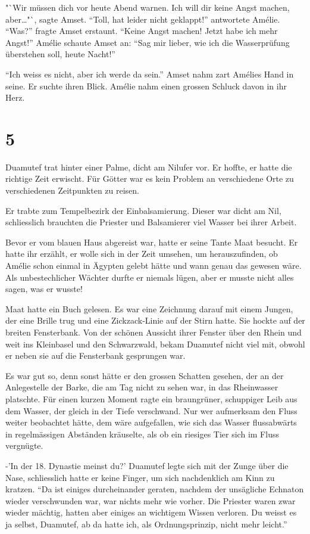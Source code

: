 \documentclass[11pt,titlepage,a5paper]{book}
\begin{document}
"`Wir müssen dich vor heute Abend warnen. Ich will dir keine Angst machen, aber\dots"`, sagte Amset. "`Toll, hat leider nicht geklappt!"' antwortete Amélie. "`Was?"' fragte Amset erstaunt. "`Keine Angst machen! Jetzt habe ich mehr Angst!"' Amélie schaute Amset an: "`Sag mir lieber, wie ich die Wasserprüfung überstehen soll, heute Nacht!"' 

"`Ich weiss es nicht, aber ich werde da sein."' Amset nahm zart Amélies Hand in seine. Er suchte ihren Blick. Amélie nahm einen grossen Schluck davon in ihr Herz.

\section*{5}

Duamutef trat hinter einer Palme, dicht am Nilufer vor. Er hoffte, er hatte die richtige Zeit erwischt. Für Götter war es kein Problem an verschiedene Orte zu verschiedenen Zeitpunkten zu reisen.

Er trabte zum Tempelbezirk der Einbalsamierung. Dieser war dicht am Nil, schliesslich brauchten die Priester und Balsamierer viel Wasser bei ihrer Arbeit.

Bevor er vom blauen Haus abgereist war, hatte er seine Tante Maat besucht. Er hatte ihr erzählt, er wolle sich in der Zeit umsehen, um herauszufinden, ob Amélie schon einmal in Ägypten gelebt hätte und wann genau das gewesen wäre. Als unbestechlicher Wächter durfte er niemals lügen, aber er musste nicht alles sagen, was er wusste! 

Maat hatte ein Buch gelesen. Es war eine Zeichnung darauf mit einem Jungen, der eine Brille trug und eine Zickzack-Linie auf der Stirn hatte. Sie hockte auf der breiten Fensterbank. Von der schönen Aussicht ihrer Fenster über den Rhein und weit ins Kleinbasel und den Schwarzwald, bekam Duamutef nicht viel mit, obwohl er neben sie auf die Fensterbank gesprungen war. 

Es war gut so, denn sonst hätte er den grossen Schatten gesehen, der an der Anlegestelle der Barke, die am Tag nicht zu sehen war, in das Rheinwasser platschte. Für einen kurzen Moment ragte ein braungrüner, schuppiger Leib aus dem Wasser, der gleich in der Tiefe verschwand. Nur wer aufmerksam den Fluss weiter beobachtet hätte, dem wäre aufgefallen, wie sich das Wasser flussabwärts in regelmässigen Abständen kräuselte, als ob ein riesiges Tier sich im Fluss vergnügte.

-'In der 18. Dynastie meinst du?' Duamutef legte sich mit der Zunge über die Nase, schliesslich hatte er keine Finger, um sich nachdenklich am Kinn zu kratzen. "`Da ist einiges durcheinander geraten, nachdem der unsägliche Echnaton wieder verschwunden war, war nichts mehr wie vorher. Die Priester waren zwar wieder mächtig, hatten aber einiges an wichtigem Wissen verloren. Du weisst es ja selbst, Duamutef, ab da hatte ich, als Ordnungsprinzip, nicht mehr leicht."'
\end{document}
